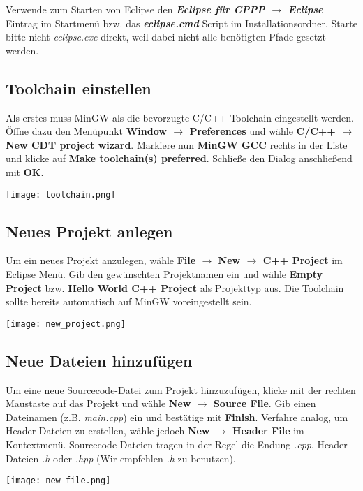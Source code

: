 Verwende zum Starten von Eclipse den \textbf{\emph{Eclipse für CPPP $\rightarrow$ Eclipse}} Eintrag im Startmenü bzw. das \textbf{\emph{eclipse.cmd}} Script im Installationsordner.
Starte bitte nicht \emph{eclipse.exe} direkt, weil dabei nicht alle benötigten Pfade gesetzt werden.

\subsection{Toolchain einstellen}

Als erstes muss MinGW als die bevorzugte C/C++ Toolchain eingestellt werden.
Öffne dazu den Menüpunkt \textbf{Window $\rightarrow$   Preferences} und wähle \textbf{C/C++ $\rightarrow$  New CDT project wizard}.
Markiere nun \textbf{MinGW GCC} rechts in der Liste und klicke auf \textbf{Make toolchain(s) preferred}.
Schließe den Dialog anschließend mit \textbf{OK}.

\texttt{[image: toolchain.png]}

\subsection{Neues Projekt anlegen}
Um ein neues Projekt anzulegen, wähle \textbf{File $\rightarrow$ New $\rightarrow$ C++ Project} im Eclipse Menü.
Gib den gewünschten Projektnamen ein und wähle \textbf{Empty Project} bzw. \textbf{Hello World C++ Project} als Projekttyp aus.
Die Toolchain sollte bereits automatisch auf MinGW voreingestellt sein.

\begin{center}
	\texttt{[image: new\_project.png]}
\end{center}

\subsection{Neue Dateien hinzufügen}

Um eine neue Sourcecode-Datei zum Projekt hinzuzufügen, klicke mit der rechten Maustaste auf das Projekt und wähle \textbf{New $\rightarrow$ Source File}.
Gib einen Dateinamen (z.B. \emph{main.cpp}) ein und bestätige mit 
\textbf{Finish}. 
Verfahre analog, um Header-Dateien zu erstellen, wähle jedoch \textbf{New $\rightarrow$ Header File} im Kontextmenü.
Sourcecode-Dateien tragen in der Regel die Endung \emph{.cpp}, Header-Dateien \emph{.h} oder \emph{.hpp} (Wir empfehlen \emph{.h} zu benutzen).

\begin{center}
	\texttt{[image: new\_file.png]}
\end{center}

